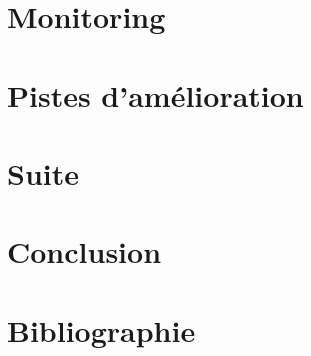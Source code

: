 \documentclass[french, 12pt, a4paper]{article}
\begin{document}
\section{Monitoring}

\newpage
\section{Pistes d'amélioration}

\newpage
\section{Suite}

\newpage
\section{Conclusion}

\newpage
\section{Bibliographie}
\end{document}
